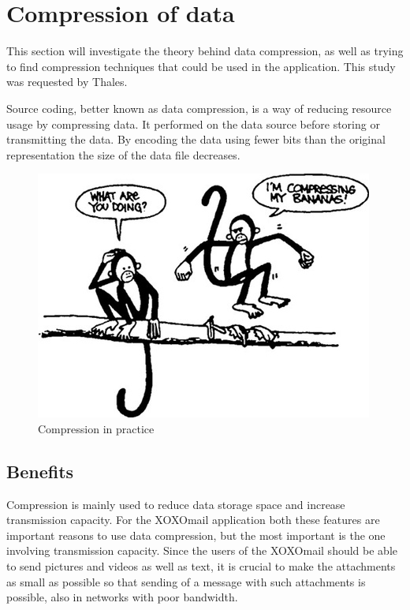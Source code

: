 
\section{Compression of data}\label{sec:compdata}

This section will investigate the theory behind data compression, as well as trying to find compression techniques that could be used in the application. This study was requested by Thales.
\newline

Source coding, better known as data compression, is a way of reducing resource usage by compressing data. It performed on the data source before storing or transmitting the data. By encoding the data using fewer bits than the original representation the size of the data file decreases.

\begin{figure}[h!]
\begin{center}
\includegraphics[scale=0.5]{compressionmonkeys}
\caption{Compression in practice \cite{bib:compressionImage}}
\end{center}
\end{figure}

\subsection{Benefits}
Compression is mainly used to reduce data storage space and increase transmission capacity. For the XOXOmail application both these features are important reasons to use data compression, but the most important is the one involving transmission capacity. Since the users of the XOXOmail should be able to send pictures and videos as well as text, it is crucial to make the attachments as small as possible so that sending of a message with such attachments is possible, also in networks with poor bandwidth.


